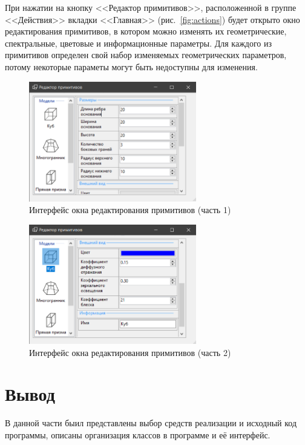 При нажатии на кнопку <<Редактор примитивов>>, расположенной в группе <<Действия>> вкладки <<Главная>> (рис.~\ref{fig:actions}) будет открыто окно редактирования примитивов, в котором можно изменять их геометрические, спектральные, цветовые и информационные параметры. Для каждого из примитивов определен свой набор изменяемых геометрических параметров, потому некоторые параметы могут быть недоступны для изменения.
\clearpage
\begin{figure}[h] 
	\centering
	\includegraphics[width=0.65\textwidth]{images/model-editor1.png}
	\caption{Интерфейс окна редактирования примитивов (часть 1)} 
	\label{fig:model-editor1} 
\end{figure}
\begin{figure}[h] 
	\centering
	\includegraphics[width=0.65\textwidth]{images/model-editor2.png}
	\caption{Интерфейс окна редактирования примитивов (часть 2)} 
	\label{fig:model-editor2} 
\end{figure}

\section{Вывод}

В данной части быил представлены выбор средств реализации и исходный код программы, описаны организация классов в программе и её интерфейс.

\clearpage
